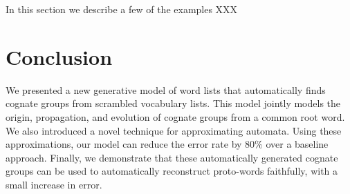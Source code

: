 \documentclass[11pt,a4paper]{article}
\begin{document}
In this section we describe a few of the examples XXX

\section{Conclusion}

We presented a new generative model of word lists that automatically
finds cognate groups from scrambled vocabulary lists. This model
jointly models the origin, propagation, and evolution of cognate
groups from a common root word. We also introduced a novel technique
for approximating automata. Using these approximations, our model
can reduce the error rate by 80\% over a baseline approach. Finally,
we demonstrate that these automatically generated cognate groups
can be used to automatically reconstruct proto-words faithfully,
with a small increase in error.

\nocite{Yarowsky00inducingmultilingual}


\end{document}
